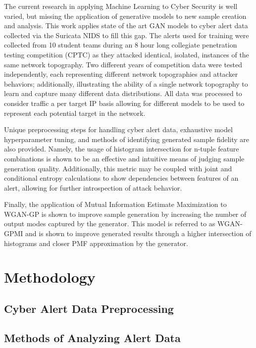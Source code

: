 \documentclass[12pt,american]{report}
\begin{document}
The current research in applying Machine Learning to Cyber Security is well varied, but missing the application of generative models to new sample creation and analysis. This work applies state of the art GAN models to cyber alert data collected via the Suricata NIDS to fill this gap. The alerts used for training were collected from 10 student teams during an 8 hour long collegiate penetration testing competition (CPTC) as they attacked identical, isolated, instances of the same network topography. Two different years of competition data were tested independently, each representing different network topographies and attacker behaviors; additionally, illustrating the ability of a single network topography to learn and capture many different data distributions. All data was processed to consider traffic a per target IP basis allowing for different models to be used to represent each potential target in the network. 

Unique preprocessing steps for handling cyber alert data, exhaustive model hyperparameter tuning, and methods of identifying generated sample fidelity are also provided. Namely, the usage of histogram intersection for n-tuple feature combinations is shown to be an effective and intuitive means of judging sample generation quality. Additionally, this metric may be coupled with joint and conditional entropy calculations to show dependencies between features of an alert, allowing for further introspection of attack behavior.

Finally, the application of Mutual Information Estimate Maximization to WGAN-GP is shown to improve sample generation by increasing the number of output modes captured by the generator. This model is referred to as WGAN-GPMI and is shown to improve generated results through a higher intersection of histograms and closer PMF approximation by the generator.

\chapter{Methodology}

\section{Cyber Alert Data Preprocessing}

\section{Methods of Analyzing Alert Data}
\end{document}
